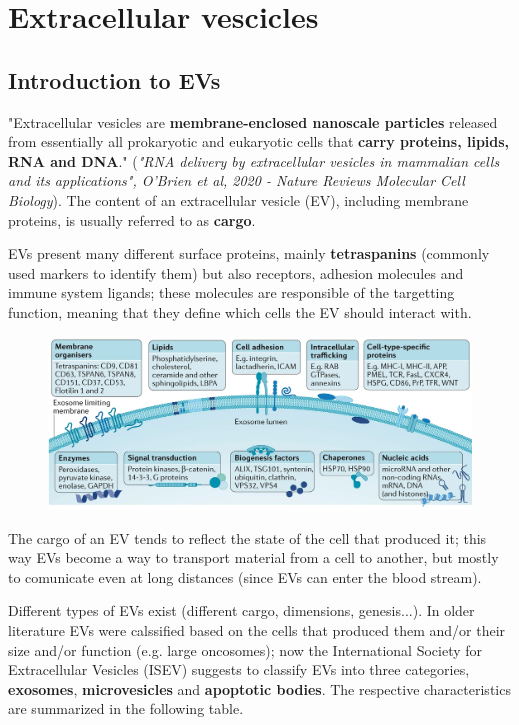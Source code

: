 \graphicspath{{chapters/TumorEvAndVesciclesImages/}}

\chapter{Extracellular vescicles}

\section{Introduction to EVs}

  "Extracellular vesicles are \textbf{membrane-enclosed nanoscale particles} released from essentially all prokaryotic and eukaryotic cells that \textbf{carry proteins, lipids, RNA and DNA}." (\textit{"RNA delivery by extracellular vesicles in mammalian cells and its applications", O’Brien et al, 2020 - Nature Reviews Molecular Cell Biology}). The content of an extracellular vesicle (EV), including membrane proteins, is usually referred to as \textbf{cargo}.

  EVs present many different surface proteins, mainly \textbf{tetraspanins} (commonly used markers to identify them) but also receptors, adhesion molecules and immune system ligands; these molecules are responsible of the targetting function, meaning that they define which cells the EV should interact with. 

  \begin{figure}[H]
  \includegraphics[scale=0.34]{image_07.png}
  \end{figure}
   
  The cargo of an EV tends to reflect the state of the cell that produced it; this way EVs become a way to transport material from a cell to another, but mostly to comunicate even at long distances (since EVs can enter the blood stream).

  Different types of EVs exist (different cargo, dimensions, genesis...). In older literature EVs were calssified based on the cells that produced them and/or their size and/or function (e.g. large oncosomes); now the International Society for Extracellular Vesicles (ISEV) suggests to classify EVs into three categories, \textbf{exosomes}, \textbf{microvesicles} and \textbf{apoptotic bodies}. The respective characteristics are summarized in the following table.
  
